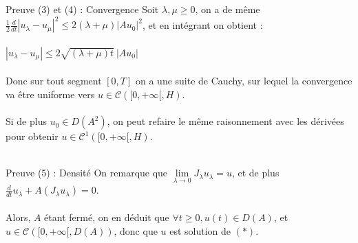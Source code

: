 \documentclass[10pt]{beamer}
\begin{document}
\begin{frame}{Preuve (3) et (4) : Convergence}
Soit $\lambda, \mu \geq 0$, on a de même  $\frac{1}{2}\frac{d}{dt}|u_\lambda-u_\mu|^2 \leq 2(\lambda + \mu) |Au_0|^2$, et en intégrant on obtient : \\~ \\
$|u_\lambda -u_\mu| \leq 2 \sqrt{(\lambda + \mu)t}\ |Au_0|$\\~ \\ 

Donc sur tout segment $[0,T]$ on a une suite de Cauchy, sur lequel la convergence va être uniforme vers $u \in \mathcal{C}([0,+\infty[,H)$. \\~\\ 

Si de plus $u_0 \in D(A^2)$, on peut refaire le même raisonnement avec les dérivées pour obtenir $u \in \mathcal{C}^1([0,+\infty[,H)$. \\~\\ 
\end{frame}


\begin{frame}{Preuve (5) : Densité}
On remarque que $\lim\limits_{\lambda\to 0} J_\lambda u_\lambda= u$, et de plus $\frac{d}{dt}u_\lambda + A(J_\lambda u_\lambda)=0$. \\~ \\
Alors, $A$ étant fermé, on en déduit que $\forall t \geq 0, u(t) \in D(A)$, et $u \in \mathcal{C}([0,+\infty[,D(A))$, donc que $u$ est solution de $(*)$.\\~ \\
\end{frame}
\end{document}
